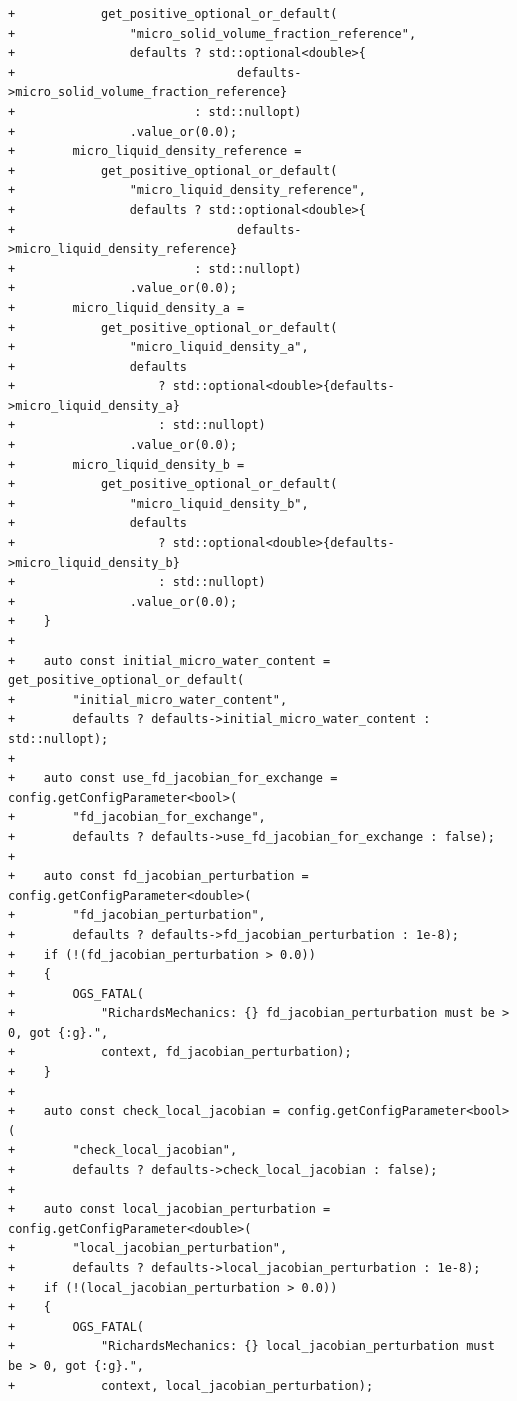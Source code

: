 \documentclass[10pt]{article}
\begin{document}
\begin{lstlisting}
+            get_positive_optional_or_default(
+                "micro_solid_volume_fraction_reference",
+                defaults ? std::optional<double>{
+                               defaults->micro_solid_volume_fraction_reference}
+                         : std::nullopt)
+                .value_or(0.0);
+        micro_liquid_density_reference =
+            get_positive_optional_or_default(
+                "micro_liquid_density_reference",
+                defaults ? std::optional<double>{
+                               defaults->micro_liquid_density_reference}
+                         : std::nullopt)
+                .value_or(0.0);
+        micro_liquid_density_a =
+            get_positive_optional_or_default(
+                "micro_liquid_density_a",
+                defaults
+                    ? std::optional<double>{defaults->micro_liquid_density_a}
+                    : std::nullopt)
+                .value_or(0.0);
+        micro_liquid_density_b =
+            get_positive_optional_or_default(
+                "micro_liquid_density_b",
+                defaults
+                    ? std::optional<double>{defaults->micro_liquid_density_b}
+                    : std::nullopt)
+                .value_or(0.0);
+    }
+
+    auto const initial_micro_water_content = get_positive_optional_or_default(
+        "initial_micro_water_content",
+        defaults ? defaults->initial_micro_water_content : std::nullopt);
+
+    auto const use_fd_jacobian_for_exchange = config.getConfigParameter<bool>(
+        "fd_jacobian_for_exchange",
+        defaults ? defaults->use_fd_jacobian_for_exchange : false);
+
+    auto const fd_jacobian_perturbation = config.getConfigParameter<double>(
+        "fd_jacobian_perturbation",
+        defaults ? defaults->fd_jacobian_perturbation : 1e-8);
+    if (!(fd_jacobian_perturbation > 0.0))
+    {
+        OGS_FATAL(
+            "RichardsMechanics: {} fd_jacobian_perturbation must be > 0, got {:g}.",
+            context, fd_jacobian_perturbation);
+    }
+
+    auto const check_local_jacobian = config.getConfigParameter<bool>(
+        "check_local_jacobian",
+        defaults ? defaults->check_local_jacobian : false);
+
+    auto const local_jacobian_perturbation = config.getConfigParameter<double>(
+        "local_jacobian_perturbation",
+        defaults ? defaults->local_jacobian_perturbation : 1e-8);
+    if (!(local_jacobian_perturbation > 0.0))
+    {
+        OGS_FATAL(
+            "RichardsMechanics: {} local_jacobian_perturbation must be > 0, got {:g}.",
+            context, local_jacobian_perturbation);

\end{lstlisting}
\end{document}
